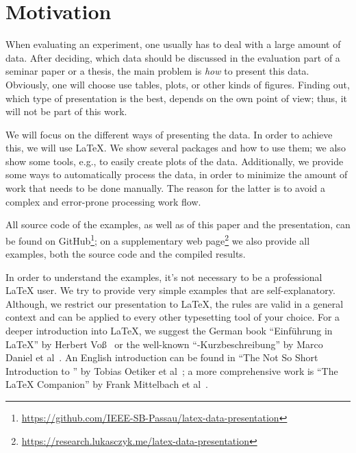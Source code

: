 \section{Motivation}

When evaluating an experiment, one usually has to deal with a large amount of
data.  After deciding, which data should be discussed in the evaluation part of
a seminar paper or a thesis, the main problem is \emph{how} to present this
data. Obviously, one will choose use tables, plots, or other kinds of figures.
Finding out, which type of presentation is the best, depends on the own point of
view; thus, it will not be part of this work.

We will focus on the different ways of presenting the data.  In order to achieve
this, we will use \LaTeX\@.  We show several packages and how to use them; we
also show some tools, e.g., to easily create plots of the data.  Additionally,
we provide some ways to automatically process the data, in order to minimize the
amount of work that needs to be done manually.  The reason for the latter is to
avoid a complex and error-prone processing work flow.

All source code of the examples, as well as of this paper and the presentation,
can be found on GitHub\footnote{%
  \href{https://github.com/IEEE-SB-Passau/latex-data-presentation}%
    {https://github.com/IEEE-SB-Passau/latex-data-presentation}}; on a
supplementary web page\footnote{%
  \href{https://research.lukasczyk.me/latex-data-presentation}%
    {https://research.lukasczyk.me/latex-data-presentation}} we also provide all
examples, both the source code and the compiled results.

In order to understand the examples, it's not necessary to be a professional
\LaTeX{} user.  We try to provide very simple examples that are
self-explanatory.  Although, we restrict our presentation to \LaTeX{}, the rules
are valid in a general context and can be applied to every other typesetting
tool of your choice.  For a deeper introduction into \LaTeX{}, we suggest the
German book \enquote{Einführung in \LaTeX} by Herbert Voß~\cite{Voss2012} or the
well-known \enquote{-Kurzbeschreibung} by Marco Daniel et
al~\cite{Daniel2015}.  An English introduction can be found in \enquote{The Not
So Short Introduction to } by Tobias Oetiker et
al~\cite{Oetiker2015}; a more comprehensive work is \enquote{The \LaTeX{}
Companion} by Frank Mittelbach et al~\cite{Mittelbach2008}.
